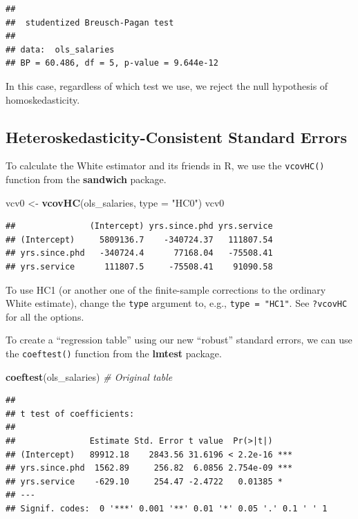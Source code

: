\documentclass[12pt,oneside,openany]{book}
\newenvironment{Shaded}{\begin{snugshade}}{\end{snugshade}}
\newcommand{\KeywordTok}[1]{\textcolor[rgb]{0.13,0.29,0.53}{\textbf{#1}}}
\newcommand{\DataTypeTok}[1]{\textcolor[rgb]{0.13,0.29,0.53}{#1}}
\newcommand{\StringTok}[1]{\textcolor[rgb]{0.31,0.60,0.02}{#1}}
\newcommand{\CommentTok}[1]{\textcolor[rgb]{0.56,0.35,0.01}{\textit{#1}}}
\newcommand{\NormalTok}[1]{#1}
\begin{document}
\begin{verbatim}
## 
##  studentized Breusch-Pagan test
## 
## data:  ols_salaries
## BP = 60.486, df = 5, p-value = 9.644e-12
\end{verbatim}

In this case, regardless of which test we use, we reject the null
hypothesis of homoskedasticity.

\subsection{Heteroskedasticity-Consistent Standard
Errors}\label{heteroskedasticity-consistent-standard-errors}

To calculate the White estimator and its friends in R, we use the
\texttt{vcovHC()} function from the \textbf{sandwich} package.

\begin{Shaded}
\begin{Highlighting}[]
\NormalTok{vcv0 <-}\StringTok{ }\KeywordTok{vcovHC}\NormalTok{(ols_salaries, }\DataTypeTok{type =} \StringTok{"HC0"}\NormalTok{)}
\NormalTok{vcv0}
\end{Highlighting}
\end{Shaded}

\begin{verbatim}
##               (Intercept) yrs.since.phd yrs.service
## (Intercept)     5809136.7    -340724.37   111807.54
## yrs.since.phd   -340724.4      77168.04   -75508.41
## yrs.service      111807.5     -75508.41    91090.58
\end{verbatim}

To use HC1 (or another one of the finite-sample corrections to the
ordinary White estimate), change the \texttt{type} argument to, e.g.,
\texttt{type\ =\ "HC1"}. See \texttt{?vcovHC} for all the options.

To create a ``regression table'' using our new ``robust'' standard
errors, we can use the \texttt{coeftest()} function from the
\textbf{lmtest} package.

\begin{Shaded}
\begin{Highlighting}[]
\KeywordTok{coeftest}\NormalTok{(ols_salaries)  }\CommentTok{# Original table}
\end{Highlighting}
\end{Shaded}

\begin{verbatim}
## 
## t test of coefficients:
## 
##               Estimate Std. Error t value  Pr(>|t|)    
## (Intercept)   89912.18    2843.56 31.6196 < 2.2e-16 ***
## yrs.since.phd  1562.89     256.82  6.0856 2.754e-09 ***
## yrs.service    -629.10     254.47 -2.4722   0.01385 *  
## ---
## Signif. codes:  0 '***' 0.001 '**' 0.01 '*' 0.05 '.' 0.1 ' ' 1
\end{verbatim}
\end{document}

